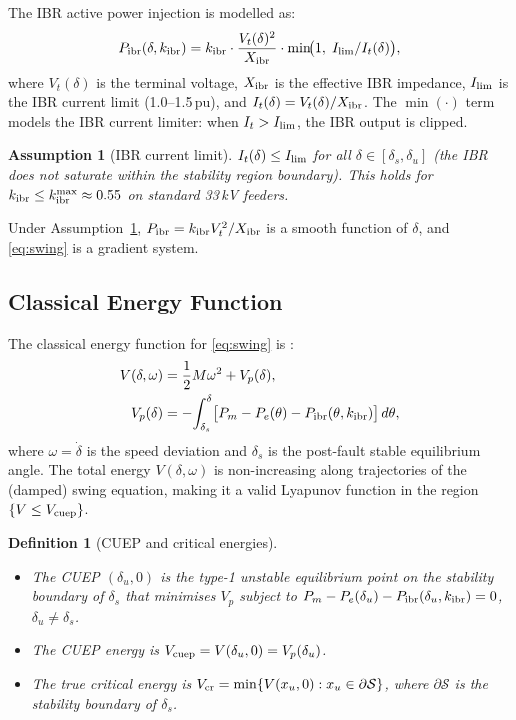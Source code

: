 \documentclass[journal]{IEEEtran}
\newtheorem{assumption}{Assumption}
\newtheorem{definition}{Definition}
\newcommand{\kibr}{k_{\rm ibr}}
\newcommand{\Vcuep}{V_{\rm cuep}}
\newcommand{\Vcr}{V_{\rm cr}}
\newcommand{\deltau}{\delta_u}
\newcommand{\deltas}{\delta_s}
\newcommand{\Pm}{P_m}
\newcommand{\Pe}{P_e}
\newcommand{\Ilim}{I_{\rm lim}}
\newcommand{\calS}{\mathcal{S}}
\begin{document}
The IBR active power injection is modelled as:
\begin{equation}
  P_{\rm ibr}(\delta, \kibr)
  = \kibr \cdot \frac{V_t(\delta)^2}{X_{\rm ibr}}
    \cdot \min\!\bigl(1,\; \Ilim/I_t(\delta)\bigr),
  \label{eq:Pibr}
\end{equation}
where $V_t(\delta)$ is the terminal voltage, $X_{\rm ibr}$ is the
effective IBR impedance, $\Ilim$ is the IBR current limit
(1.0--1.5\,pu), and $I_t(\delta) = V_t(\delta)/X_{\rm ibr}$.
The $\min(\cdot)$ term models the IBR current limiter:
when $I_t > \Ilim$, the IBR output is clipped.

\begin{assumption}[IBR current limit]
\label{asm:ilim}
$I_t(\delta) \leq \Ilim$ for all $\delta \in [\deltas, \deltau]$
(the IBR does not saturate within the stability region boundary).
This holds for $\kibr \leq \kibr^{\max} \approx 0.55$ on
standard 33\,kV feeders.
\end{assumption}

Under Assumption~\ref{asm:ilim}, $P_{\rm ibr} = \kibr V_t^2/X_{\rm ibr}$
is a smooth function of $\delta$, and \eqref{eq:swing} is a gradient system.

\subsection{Classical Energy Function}

The classical energy function for \eqref{eq:swing} is \cite{Kundur1994,Pai1989energy}:
\begin{align}
  V(\delta, \omega) &= \frac{1}{2}M\omega^2 + V_p(\delta),
  \label{eq:energy}\\
  V_p(\delta) &= -\!\int_{\deltas}^{\delta}
    \bigl[\Pm - \Pe(\theta) - P_{\rm ibr}(\theta,\kibr)\bigr]\,d\theta,
  \label{eq:Vp}
\end{align}
where $\omega = \dot\delta$ is the speed deviation and $\deltas$
is the post-fault stable equilibrium angle.
The total energy $V(\delta,\omega)$ is non-increasing along
trajectories of the (damped) swing equation, making it a valid
Lyapunov function in the region $\{V \leq \Vcuep\}$.

\begin{definition}[CUEP and critical energies]
\label{def:energy}
\begin{itemize}
  \item The \emph{CUEP} $(\deltau, 0)$ is the type-1 unstable equilibrium
        point on the stability boundary of $\deltas$ that minimises
        $V_p$ subject to $\Pm - \Pe(\deltau) - P_{\rm ibr}(\deltau,\kibr) = 0$,
        $\deltau \neq \deltas$.
  \item The \emph{CUEP energy} is $\Vcuep = V(\deltau, 0) = V_p(\deltau)$.
  \item The \emph{true critical energy} is
        $\Vcr = \min\{V(x_u, 0) : x_u \in \partial\calS\}$,
        where $\partial\calS$ is the stability boundary of $\deltas$.
\end{itemize}
\end{definition}
\end{document}
